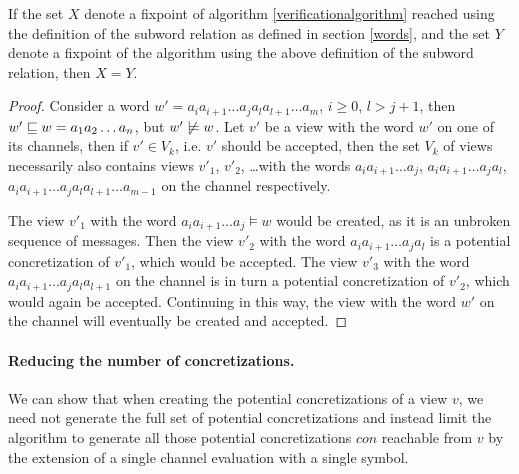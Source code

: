 \begin{lemma}
If the set $X$ denote a fixpoint of algorithm \ref{verificationalgorithm} reached using the definition of the subword relation as defined in section \ref{words}, and the set $Y$ denote a fixpoint of the algorithm using the above definition of the subword relation, then $X=Y$.
\end{lemma}

\begin{proof}
Consider a word $w' = a_ia_{i+1}\ldots a_ja_la_{l+1}\ldots a_m$, $i \geq 0$, $l > j+1$, then $w' \sqsubseteq w = a_1a_2\ldots a_n$, but $w' \centernot\models w$.
Let $v'$ be a view with the word $w'$ on one of its channels, then if $v' \in V_k$, i.e. $v'$ should be accepted, then the set $V_k$ of views necessarily also contains views $v'_1$, $v'_2$, \ldots with the words $a_ia_{i+1}\ldots a_j$, $a_ia_{i+1}\ldots a_ja_l$, $a_ia_{i+1}\ldots a_ja_la_{l+1}\ldots a_{m-1}$ on the channel respectively.

The view $v'_1$ with the word $a_ia_{i+1}\ldots a_j \models w$ would be created, as it is an unbroken sequence of messages. Then the view $v'_2$ with the word $a_ia_{i+1}\ldots a_ja_l$ is a potential concretization of $v'_1$, which would be accepted. The view $v'_3$ with the word $a_ia_{i+1}\ldots a_ja_la_{l+1}$ on the channel is in turn a potential concretization of $v'_2$, which would again be accepted. Continuing in this way, the view with the word $w'$ on the channel will eventually be created and accepted.
\end{proof}


\paragraph{Reducing the number of concretizations.}
We can show that when creating the potential concretizations of a view $v$, we need not generate the full set of potential concretizations and instead limit the algorithm to generate all those potential concretizations $con$ reachable from $v$ by the extension of a single channel evaluation with a single symbol.

